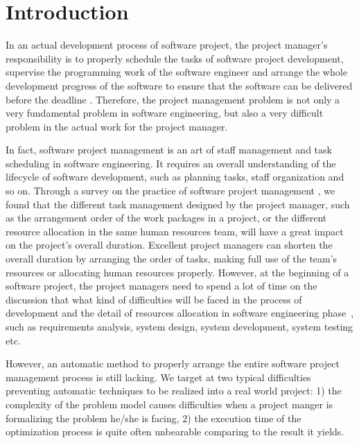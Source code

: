 
\section{Introduction}

%
In an actual
development process of software project, the project manager's responsibility is
to properly schedule the tasks of software project development, supervise the
programming work of the software engineer and arrange the whole development
progress of the software to ensure that the software can be delivered before the
deadline \cite{stellman}. 
Therefore, the project management problem is not only
a very fundamental problem in software engineering, but also a very difficult
problem in the actual work for the project manager.

In fact, software project management is an art of staff management and task scheduling in software engineering. It requires an overall understanding of the lifecycle of software development, such as planning tasks, staff organization and so on. 
Through a survey on the practice of software project management \cite{chang,alba,ren,penta}, we found that the different task management designed by the project manager, such as  the arrangement order of the work packages in a project, or the different  resource allocation in the same human resources team, will have a great  impact on the project's overall duration.
Excellent project managers can  shorten the overall duration by arranging the order of tasks, making full use  of the team's resources or allocating human resources properly. However, at the beginning of a software project, the project managers need to spend a lot  of time on the discussion that what kind of difficulties will be faced in the process of development and the detail of resources allocation in  software engineering phase~\cite{pentico}, such as requirements analysis, system design, system development, system testing etc. 

However, an automatic method to properly arrange the entire software project management process is still lacking. 
We target at two typical difficulties preventing automatic techniques to be realized into a real world project: 
1) the complexity of the problem model causes difficulties when a project manger is formalizing the problem he\slash she is facing, 
2) the execution time of the optimization process is quite often unbearable comparing to the result it yields. 


